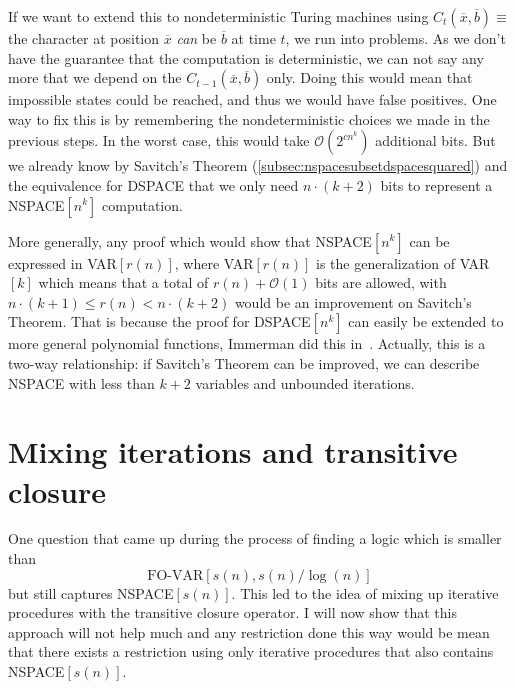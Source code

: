 If we want to extend this to nondeterministic Turing machines using $C_{t}(\overline{x}, \overline{b}) \equiv $ the character at position $\overline{x}$ \emph{can} be $\overline{b}$ at time $t$, we run into problems.
As we don't have the guarantee that the computation is deterministic, we can not say any more that we depend on the $C_{t - 1}(\overline{x}, \overline{b})$ only.
Doing this would mean that impossible states could be reached, and thus we would have false positives.
One way to fix this is by remembering the nondeterministic choices we made in the previous steps.
In the worst case, this would take $\mathcal{O}(2^{cn^k})$ additional bits.
But we already know by Savitch's Theorem (\cref{subsec:nspacesubsetdspacesquared}) and the equivalence for DSPACE that we only need $n \cdot (k + 2)$ bits to represent a NSPACE$[n^k]$ computation.

More generally, any proof which would show that NSPACE$[n^k]$ can be expressed in VAR$[r(n)]$, where VAR$[r(n)]$ is the generalization of VAR$[k]$ which means that a total of $r(n) + \mathcal{O}(1)$ bits are allowed, with $n \cdot (k + 1) \leq r(n) < n \cdot (k + 2)$ would be an improvement on Savitch's Theorem.
That is because the proof for DSPACE$[n^k]$ can easily be extended to more general polynomial functions, Immerman did this in~\cite{Immerman1999}.
Actually, this is a two-way relationship: if Savitch's Theorem can be improved, we can describe NSPACE with less than $k + 2$ variables and unbounded iterations.

\section{Mixing iterations and transitive closure}\label{sec:mixing-iterations-and-transitive-closure}

One question that came up during the process of finding a logic which is smaller than \[\text{FO-VAR}[s(n), s(n)/\log(n)]\] but still captures NSPACE$[s(n)]$.
This led to the idea of mixing up iterative procedures with the transitive closure operator.
I will now show that this approach will not help much and any restriction done this way would be mean that there exists a restriction using only iterative procedures that also contains NSPACE$[s(n)]$.

